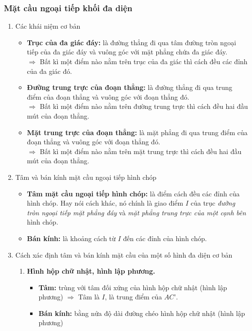 \subsubsection{Mặt cầu ngoại tiếp khối đa diện}
\begin{enumerate}
\item Các khái niệm cơ bản
\begin{itemize}
	\item \textbf{Trục của đa giác đáy:} là đường thẳng đi qua tâm đường tròn ngoại tiếp của đa giác đáy và vuông góc với mặt phẳng chứa đa giác đáy.\\
	$ \Rightarrow $ Bất kì một điểm nào nằm trên trục của đa giác thì cách đều các đỉnh của đa giác đó.
	\item \textbf{Đường trung trực của đoạn thẳng:} là đường thẳng đi qua trung điểm của đoạn thẳng và vuông góc với đoạn thẳng đó.\\
	$ \Rightarrow $ Bất kì một điểm nào nằm trên đường trung trực thì cách đều hai đầu mút của đoạn thẳng.
	\item \textbf{Mặt trung trực của đoạn thẳng:} là mặt phẳng đi qua trung điểm của đoạn thẳng và vuông góc với đoạn thẳng đó.\\
	$ \Rightarrow $ Bất kì một điểm nào nằm trên mặt trung trực thì cách đều hai đầu mút của đoạn thẳng.
\end{itemize}
\item Tâm và bán kính mặt cầu ngoại tiếp hình chóp
\begin{itemize}
	\item \textbf{Tâm mặt cầu ngoại tiếp hình chóp:} là điểm cách đều các đỉnh của hình chóp. Hay nói cách khác, nó chính là giao điểm $ I $ của trục \textit{đường tròn ngoại tiếp mặt phẳng đáy} và \textit{mặt phẳng trung trực của một cạnh bên} hình chóp.
	\item \textbf{Bán kính:} là khoảng cách từ $ I $ đến các đỉnh của hình chóp.
\end{itemize}
\item Cách xác định tâm và bán kính mặt cầu của một số hình đa diện cơ bản
\begin{enumerate}[1)]
	\item \textbf{Hình hộp chữ nhật, hình lập phương.}
	\immini
	{ \begin{itemize}
			\item \textbf{Tâm:} trùng với tâm đối xứng của hình hộp chữ nhật (hình lập phương)
			$ \Rightarrow $ Tâm là $I$, là trung điểm của $AC’$.
			\item \textbf{Bán kính:} bằng nửa độ dài đường chéo hình hộp chữ nhật (hình lập phương)\\

\end{itemize}}
\end{enumerate}
\end{enumerate}
